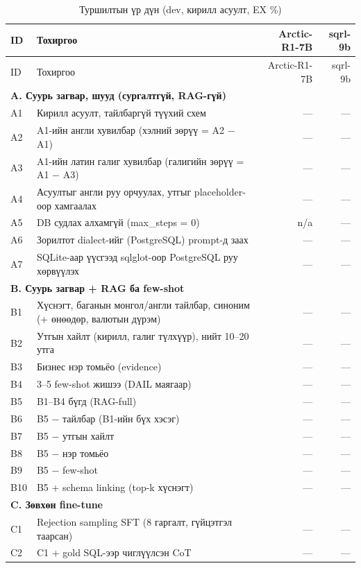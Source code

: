 \begin{small}
\begin{longtable}{p{1.0cm}p{7.6cm}rr}
\caption{Туршилтын үр дүн (dev, кирилл асуулт, EX \%)}\label{tab:results-dev}\\
\toprule ID & Тохиргоо & Arctic-R1-7B & sqrl-9b \\\midrule\endfirsthead
\toprule ID & Тохиргоо & Arctic-R1-7B & sqrl-9b \\\midrule\endhead
\multicolumn{4}{l}{\textbf{A. Суурь загвар, шууд (сургалтгүй, RAG-гүй)}}\\
A1 & Кирилл асуулт, тайлбаргүй түүхий схем & — & — \\
A2 & A1-ийн англи хувилбар (хэлний зөрүү = A2 − A1) & — & — \\
A3 & A1-ийн латин галиг хувилбар (галигийн зөрүү = A1 − A3) & — & — \\
A4 & Асуултыг англи руу орчуулах, утгыг placeholder-оор хамгаалах & — & — \\
A5 & DB судлах алхамгүй (max\_steps = 0) & n/a & — \\
A6 & Зорилтот dialect-ийг (PostgreSQL) prompt-д заах & — & — \\
A7 & SQLite-аар үүсгээд sqlglot-оор PostgreSQL руу хөрвүүлэх & — & — \\
\multicolumn{4}{l}{\textbf{B. Суурь загвар + RAG ба few-shot}}\\
B1 & Хүснэгт, баганын монгол/англи тайлбар, синоним (+ өнөөдөр, валютын дүрэм) & — & — \\
B2 & Утгын хайлт (кирилл, галиг түлхүүр), нийт 10–20 утга & — & — \\
B3 & Бизнес нэр томьёо (evidence) & — & — \\
B4 & 3–5 few-shot жишээ (DAIL маягаар) & — & — \\
B5 & B1–B4 бүгд (RAG-full) & — & — \\
B6 & B5 − тайлбар (B1-ийн бүх хэсэг) & — & — \\
B7 & B5 − утгын хайлт & — & — \\
B8 & B5 − нэр томьёо & — & — \\
B9 & B5 − few-shot & — & — \\
B10 & B5 + schema linking (top-k хүснэгт) & — & — \\
\multicolumn{4}{l}{\textbf{C. Зөвхөн fine-tune}}\\
C1 & Rejection sampling SFT (8 гаргалт, гүйцэтгэл таарсан) & — & — \\
C2 & C1 + gold SQL-ээр чиглүүлсэн CoT & — & — \\

\end{longtable}
\end{small}
